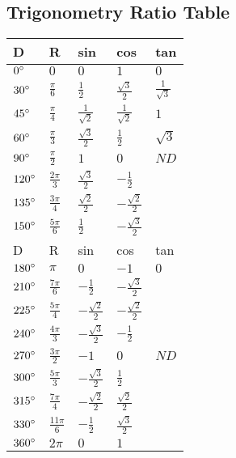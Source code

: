\documentclass{extarticle}
\begin{document}
\begin{multicols}{4}
\section{Trigonometry Ratio Table}
    \begin{tabu}{|X|X|X|X|X|}
    \hline
D				& R					& sin				& cos						& tan						\\ \hline
$0\degree$	& $0$					& $0$				& $1$						& $0$						\\ \hline
$30\degree$	& $\frac{\pi}{6}$	& $\frac{1}{2}$	& $\frac{\sqrt{3}}{2}$	& $\frac{1}{\sqrt{3}}$	\\ \hline
$45\degree$	& $\frac{\pi}{4}$	& $\frac{1}{\sqrt{2}}$	& $\frac{1}{\sqrt{2}}$	& $1$	\\ \hline
$60\degree$	& $\frac{\pi}{3}$	& $\frac{\sqrt{3}}{2}$	& $\frac{1}{2}$	& $\sqrt{3}$	\\ \hline
$90\degree$	& $\frac{\pi}{2}$	& $1$	& $0$	& $ND$	\\ \hline
$120\degree$	& $\frac{2\pi}{3}$	& $\frac{\sqrt{3}}{2}$	& $-\frac{1}{2}$	& $ $	\\ \hline
$135\degree$	& $\frac{3\pi}{4}$	& $\frac{\sqrt{2}}{2}$	& $-\frac{\sqrt{2}}{2}$	& $ $	\\ \hline
$150\degree$	& $\frac{5\pi}{6}$	& $\frac{1}{2}$	& $-\frac{\sqrt{3}}{2}$	& $ $	\\ \hline
D				& R					& sin				& cos						& tan						\\ \hline
$180\degree$	& $\pi$					& $0$				& $-1$						& $0$						\\ \hline
$210\degree$	& $\frac{7\pi}{6}$	& $-\frac{1}{2}$	& $-\frac{\sqrt{3}}{2}$	& $ $	\\ \hline
$225\degree$	& $\frac{5\pi}{4}$	& $-\frac{\sqrt{2}}{2}$	& $-\frac{\sqrt{2}}{2}$	& $ $	\\ \hline
$240\degree$	& $\frac{4\pi}{3}$	& $-\frac{\sqrt{3}}{2}$	& $-\frac{1}{2}$	& $ $	\\ \hline
$270\degree$	& $\frac{3\pi}{2}$	& $-1$	& $0$	& $ND$	\\ \hline
$300\degree$	& $\frac{5\pi}{3}$	& $-\frac{\sqrt{3}}{2}$	& $\frac{1}{2}$	& $ $	\\ \hline
$315\degree$	& $\frac{7\pi}{4}$	& $-\frac{\sqrt{2}}{2}$	& $\frac{\sqrt{2}}{2}$	& $ $	\\ \hline
$330\degree$	& $\frac{11\pi}{6}$	& $-\frac{1}{2}$	& $\frac{\sqrt{3}}{2}$	& $ $	\\ \hline


$360\degree$ & $2\pi$ & $0$ & $1$ & $ $ \\ \hline
    \end{tabu}




\end{multicols}
\end{document}
